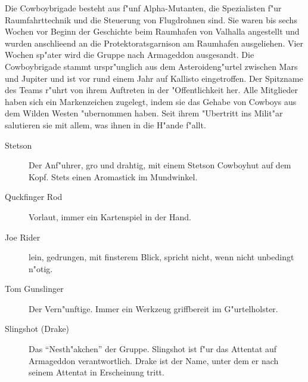 
Die Cowboybrigade besteht aus f"unf Alpha-Mutanten, die Spezialisten f"ur Raumfahrttechnik und die Steuerung von Flugdrohnen sind. Sie waren bis sechs Wochen vor Beginn der Geschichte beim Raumhafen von Valhalla angestellt und wurden anschlie\3end an die Protektoratsgarnison am Raumhafen ausgeliehen. Vier Wochen sp"ater wird die Gruppe nach Armageddon ausgesandt. Die Cowboybrigade stammt urspr"unglich aus dem Asteroideng"urtel zwischen Mars und Jupiter und ist vor rund einem Jahr auf Kallisto eingetroffen. Der Spitzname des Teams r"uhrt von ihrem Auftreten in der "Offentlichkeit her. Alle Mitglieder haben sich ein Markenzeichen zugelegt, indem sie das Gehabe von Cowboys aus dem Wilden Westen "ubernommen haben. Seit ihrem "Ubertritt ins Milit"ar salutieren sie mit allem, was ihnen in die H"ande f"allt.

\begin{description}
    \item[Stetson] Der Anf"uhrer, gro\3 und drahtig, mit einem Stetson Cowboyhut auf dem Kopf. Stets einen Aromastick im Mundwinkel.
    \item[Quckfinger Rod] Vorlaut, immer ein Kartenspiel in der Hand.
    \item[Joe Rider] lein, gedrungen, mit finsterem Blick, spricht nicht, wenn nicht unbedingt n"otig.
    \item[Tom Gunslinger] Der Vern"unftige. Immer ein Werkzeug griffbereit im G"urtelholster.
    \item[Slingshot (Drake)]  Das ``Nesth"akchen'' der Gruppe. Slingshot ist f"ur das Attentat auf Armageddon verantwortlich. Drake ist der 
        Name, unter dem er nach seinem Attentat in Erscheinung tritt.
\end{description}

\newpage
